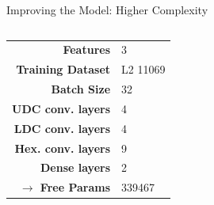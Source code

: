 \begin{frame}{Improving the Model: Higher Complexity}
    \begin{columns}
        \begin{column}{.35\textwidth}
            \begin{tabular}{>{\small\bf}r l}
                \toprule
                Features                  & 3          \\
                Training Dataset          & L2 11069   \\
                Batch Size                & 32         \\
                UDC conv. layers          & 4          \\
                LDC conv. layers          & 4          \\
                Hex. conv. layers         & 9          \\
                Dense layers              & 2\times100 \\
                $\rightarrow$ Free Params & 339467     \\
                \bottomrule
            \end{tabular}
        \end{column}
        \begin{column}{.65\textwidth}
        \end{column}
    \end{columns}
\end{frame}
